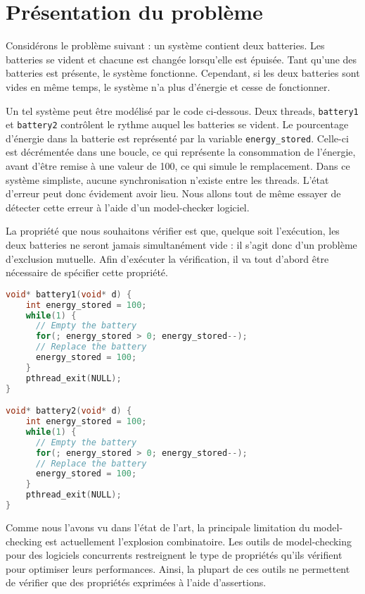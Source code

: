 \label{sec:Theme1}

\section{Présentation du problème}

Considérons le problème suivant : un système contient deux batteries. Les
batteries se vident et chacune est changée lorsqu'elle est épuisée. Tant qu'une
des batteries est présente, le système fonctionne. Cependant, si les deux
batteries sont vides en même temps, le système n'a plus d'énergie et cesse de
fonctionner.

Un tel système peut être modélisé par le code ci-dessous. Deux threads,
\lstinline!battery1! et \lstinline!battery2! contrôlent le rythme auquel les
batteries se vident. Le pourcentage d'énergie dans la batterie est représenté
par la variable \lstinline!energy_stored!. Celle-ci est décrémentée dans une
boucle, ce qui représente la consommation de l'énergie, avant d'être remise à
une valeur de 100, ce qui simule le remplacement. Dans ce système simpliste,
aucune synchronisation n'existe entre les threads. L'état d'erreur peut donc
évidement avoir lieu. Nous allons tout de même essayer de détecter cette erreur
à l'aide d'un model-checker logiciel.

La propriété que nous souhaitons vérifier est que, quelque soit
l'exécution, les deux batteries ne seront jamais simultanément vide : il
s'agit donc d'un problème d'exclusion mutuelle. Afin d'exécuter la
vérification, il va tout d'abord être nécessaire de spécifier cette
propriété.

\begin{lstlisting}[language=C]
void* battery1(void* d) {
    int energy_stored = 100;
    while(1) {
      // Empty the battery
      for(; energy_stored > 0; energy_stored--);
      // Replace the battery
      energy_stored = 100;
    }
    pthread_exit(NULL);
}

void* battery2(void* d) {
    int energy_stored = 100;
    while(1) {
      // Empty the battery
      for(; energy_stored > 0; energy_stored--);
      // Replace the battery
      energy_stored = 100;
    }
    pthread_exit(NULL);
}
\end{lstlisting}

Comme nous l'avons vu dans l'état de l'art, la principale limitation du
model-checking est actuellement l'explosion combinatoire. Les outils de
model-checking pour des logiciels concurrents restreignent le type de
propriétés qu'ils vérifient pour optimiser leurs performances. Ainsi, la
plupart de ces outils ne permettent de vérifier que des propriétés
exprimées à l'aide d'assertions.

